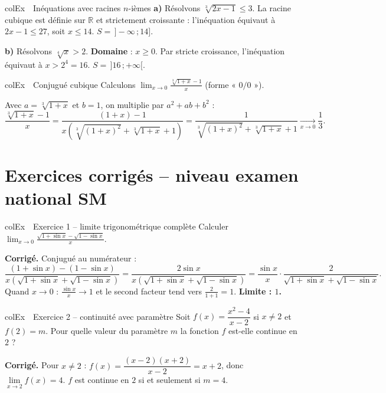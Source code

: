\documentclass[11pt,a4paper]{article}
\newenvironment{exemple}[1][Exemple]
  {\begin{fiche}{colEx}{\ding{217}~~#1}}{\end{fiche}}
\begin{document}
\begin{exemple}[Inéquations avec racines $n$-ièmes]
\textbf{a)} Résolvons $\sqrt[3]{2x - 1} \leq 3$. La racine cubique est définie sur $\mathbb{R}$ et strictement croissante : l'inéquation équivaut à $2x - 1 \leq 27$, soit $x \leq 14$. $S = \,]-\infty\,;14]$.

\smallskip
\textbf{b)} Résolvons $\sqrt[4]{x} > 2$. \textbf{Domaine} : $x \geq 0$. Par stricte croissance, l'inéquation équivaut à $x > 2^4 = 16$. $S = \,]16\,;+\infty[$.
\end{exemple}

\begin{exemple}[Conjugué cubique]
Calculons $\displaystyle\lim_{x \to 0} \frac{\sqrt[3]{1 + x} - 1}{x}$ (forme « $0/0$ »).

\smallskip
Avec $a = \sqrt[3]{1+x}$ et $b = 1$, on multiplie par $a^2 + ab + b^2$ :
\[
  \frac{\sqrt[3]{1+x} - 1}{x}
  = \frac{(1 + x) - 1}{x\left(\sqrt[3]{(1+x)^2} + \sqrt[3]{1+x} + 1\right)}
  = \frac{1}{\sqrt[3]{(1+x)^2} + \sqrt[3]{1+x} + 1}
  \xrightarrow[x \to 0]{} \frac{1}{3}.
\]
\end{exemple}

\section{Exercices corrigés -- niveau examen national SM}

\begin{exemple}[Exercice 1 -- limite trigonométrique complète]
Calculer $\displaystyle\lim_{x \to 0} \frac{\sqrt{1 + \sin x} - \sqrt{1 - \sin x}}{x}$.

\smallskip
\textbf{Corrigé.} Conjugué au numérateur :
\[
  \frac{(1 + \sin x) - (1 - \sin x)}{x\left(\sqrt{1 + \sin x} + \sqrt{1 - \sin x}\right)}
  = \frac{2\sin x}{x\left(\sqrt{1 + \sin x} + \sqrt{1 - \sin x}\right)}
  = \frac{\sin x}{x} \cdot \frac{2}{\sqrt{1 + \sin x} + \sqrt{1 - \sin x}}.
\]
Quand $x \to 0$ : $\frac{\sin x}{x} \to 1$ et le second facteur tend vers $\frac{2}{1 + 1} = 1$. \textbf{Limite : $1$.}
\end{exemple}

\begin{exemple}[Exercice 2 -- continuité avec paramètre]
Soit $f(x) = \dfrac{x^2 - 4}{x - 2}$ si $x \neq 2$ et $f(2) = m$. Pour quelle valeur du paramètre $m$ la fonction $f$ est-elle continue en $2$ ?

\smallskip
\textbf{Corrigé.} Pour $x \neq 2$ : $f(x) = \dfrac{(x-2)(x+2)}{x - 2} = x + 2$, donc $\lim\limits_{x \to 2} f(x) = 4$. $f$ est continue en $2$ si et seulement si $m = 4$.
\end{exemple}
\end{document}
